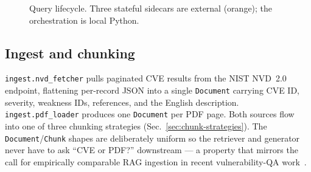 \documentclass[conference]{IEEEtran}
\begin{document}
\begin{figure}[t]
\centering
{}
\caption{Query lifecycle. Three stateful sidecars are external
(orange); the orchestration is local Python.}
\label{fig:arch}
\end{figure}

\subsection{Ingest and chunking}
\label{sec:chunk}
\texttt{ingest.nvd\_fetcher} pulls paginated CVE results from the
NIST NVD~2.0 endpoint, flattening per-record JSON into a single
\texttt{Document} carrying CVE ID, severity, weakness IDs, references,
and the English description. \texttt{ingest.pdf\_loader} produces one
\texttt{Document} per PDF page. Both sources flow into one of three
chunking strategies (Sec.~\ref{sec:chunk-strategies}). The
\texttt{Document}/\texttt{Chunk} shapes are deliberately uniform so
the retriever and generator never have to ask ``CVE or PDF?''
downstream --- a property that mirrors the call for empirically
comparable RAG ingestion in recent vulnerability-QA
work~\cite{nguyen2024cveqa}.
\end{document}

